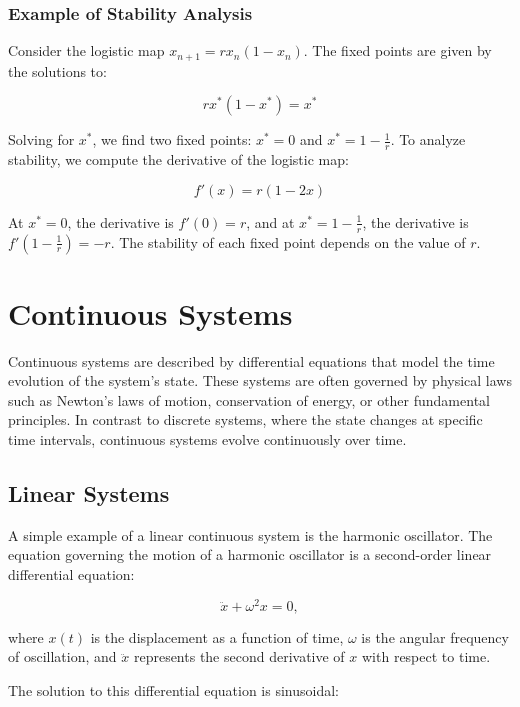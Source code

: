 \documentclass{amsbook}
\begin{document}
\subsubsection{Example of Stability Analysis}
Consider the logistic map \( x_{n+1} = r x_n (1 - x_n) \). The fixed points are given by the solutions to:

\[
r x^* (1 - x^*) = x^*
\]

Solving for \( x^* \), we find two fixed points: \( x^* = 0 \) and \( x^* = 1 - \frac{1}{r} \). To analyze stability, we compute the derivative of the logistic map:

\[
f'(x) = r(1 - 2x)
\]

At \( x^* = 0 \), the derivative is \( f'(0) = r \), and at \( x^* = 1 - \frac{1}{r} \), the derivative is \( f'(1 - \frac{1}{r}) = -r \). The stability of each fixed point depends on the value of \( r \).



\section{Continuous Systems}

Continuous systems are described by differential equations that model the time evolution of the system's state. These systems are often governed by physical laws such as Newton's laws of motion, conservation of energy, or other fundamental principles. In contrast to discrete systems, where the state changes at specific time intervals, continuous systems evolve continuously over time.

\subsection{Linear Systems}

A simple example of a linear continuous system is the harmonic oscillator. The equation governing the motion of a harmonic oscillator is a second-order linear differential equation:

\begin{equation}
    \ddot{x} + \omega^2 x = 0,
\end{equation}

where \(x(t)\) is the displacement as a function of time, \(\omega\) is the angular frequency of oscillation, and \(\ddot{x}\) represents the second derivative of \(x\) with respect to time.

The solution to this differential equation is sinusoidal:
\end{document}
